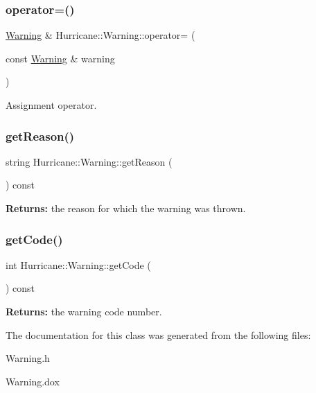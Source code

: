 \subsubsection{\texorpdfstring{operator=()}{operator=()}}
{\footnotesize\ttfamily \mbox{\hyperlink{classHurricane_1_1Warning}{Warning}} \& Hurricane\+::\+Warning\+::operator= (\begin{DoxyParamCaption}\item[{const \mbox{\hyperlink{classHurricane_1_1Warning}{Warning}} \&}]{warning }\end{DoxyParamCaption})}

Assignment operator. \mbox{\label{classHurricane_1_1Warning_afe26e9c4e0801d112d743d8afe8c3ac3}} 
\subsubsection{\texorpdfstring{get\+Reason()}{getReason()}}
{\footnotesize\ttfamily string Hurricane\+::\+Warning\+::get\+Reason (\begin{DoxyParamCaption}{ }\end{DoxyParamCaption}) const\hspace{0.3cm}{\ttfamily [inline]}}

{\bfseries Returns\+:} the reason for which the warning was thrown. \mbox{\label{classHurricane_1_1Warning_a28350d25d1691b754fd8d79d1539234c}} 
\subsubsection{\texorpdfstring{get\+Code()}{getCode()}}
{\footnotesize\ttfamily int Hurricane\+::\+Warning\+::get\+Code (\begin{DoxyParamCaption}{ }\end{DoxyParamCaption}) const\hspace{0.3cm}{\ttfamily [inline]}}

{\bfseries Returns\+:} the warning code number. 

The documentation for this class was generated from the following files\+:\begin{DoxyCompactItemize}
\item 
Warning.\+h\item 
Warning.\+dox\end{DoxyCompactItemize}
